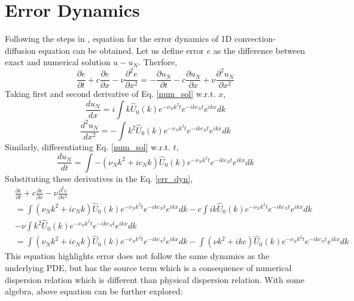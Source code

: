 \documentclass[fleqn]{article}
\begin{document}
\section{Error Dynamics}
Following the steps in \cite{TKS_book}, equation for the error dynamics of 1D convection-diffusion equation can be obtained. Let us define error $e$ as the difference between exact and numerical solution $u-u_N$. Therfore,
\begin{equation}
\frac{\partial e}{\partial t} + c \frac{\partial e}{\partial x} - \nu \frac{\partial^2 e}{\partial x^2} = -\frac{\partial u_N}{\partial t} - c \frac{\partial u_N}{\partial x} + \nu \frac{\partial^2 u_N}{\partial x^2} 
\label{err_dyn}
\end{equation}
Taking first and second derivative of Eq. \ref{num_sol} w.r.t. $x$,
\begin{equation*}
\frac{d u_N}{dx} = i \int k \hat{U}_0(k) e^{-\nu_N k^2 t} e^{-i k c_N t} e^{i k x} dk
\end{equation*}
\begin{equation*}
\frac{d^2 u_N}{dx^2} = -\int k^2 \hat{U}_0(k) e^{-\nu_N k^2 t} e^{-i k c_N t} e^{i k x} dk
\end{equation*}
Similarly, differentiating Eq. \ref{num_sol} w.r.t. $t$,\begin{equation*}
\frac{d u_N}{dt} = \int -(\nu_N k^2 + i c_N k) \hat{U}_0(k) e^{-\nu_N k^2 t} e^{-i k c_N t} e^{i k x} dk
\end{equation*}
Substituting these derivatives in the Eq. \ref{err_dyn},
\begin{align*}
&\frac{\partial e}{\partial t} + c \frac{\partial e}{\partial x} - \nu \frac{\partial^2 e}{\partial x^2} \\
& = \int (\nu_N k^2 + i c_N k) \hat{U}_0(k) e^{-\nu_N k^2 t} e^{-i k c_N t} e^{i k x} dk - c \int ik \hat{U}_0(k) e^{-\nu_N k^2 t} e^{-i k c_N t} e^{i k x} dk \\
& - \nu \int k^2 \hat{U}_0(k) e^{-\nu_N k^2 t} e^{-i k c_N t} e^{i k x} dk \\
& = \int (\nu_N k^2 + i c_N k) \hat{U}_0(k) e^{-\nu_N k^2 t} e^{-i k c_N t} e^{i k x} dk - \int (\nu k^2+ikc) \hat{U}_0(k) e^{-\nu_N k^2 t} e^{-i k c_N t} e^{i k x} dk 
\end{align*}
This equation highlights error does not follow the same dynamics as the underlying PDE, but has the source term which is a consequence of numerical dispersion relation which is different than physical dispersion relation. With some algebra, above equation can be further explored:
\end{document}
